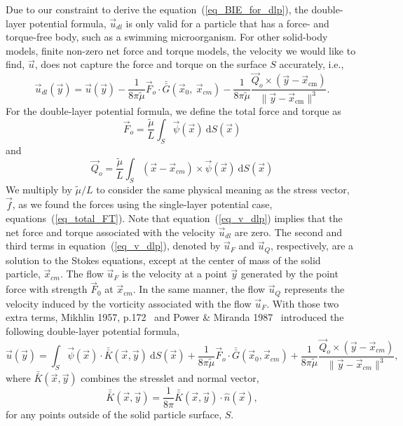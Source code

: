 Due to our constraint to derive the equation~(\ref{eq_BIE_for_dlp}), the double-layer potential formula, $\vec{u}_{dl}$ is only valid for a particle that has a force- and torque-free body, such as a swimming microorganism.
For other solid-body models, finite non-zero net force and torque models, the velocity we would like to find, $\vec{u}$, does not capture the force and torque on the surface $S$ accurately, i.e., 
\begin{equation}
\vec{u}_{dl}(\vec{y}) = \vec{u}(\vec{y}) 
- \frac{1}{8 \pi \tilde{\mu} }\vec{F}_o \cdot \bar{\bar{G}}(\vec{x}_{0}, \ \vec{x}_{cm})
- \frac{1}{8 \pi \tilde{\mu} } \frac{\vec{Q}_o \times  (\vec{y}   - \vec{x}_{\text{cm}} ) }{\| \vec{y}   - \vec{x}_{\text{cm}} \|^3 }.
\label{eq_v_dlp}
\end{equation}
For the double-layer potential formula, we define the total force and torque as
\begin{equation}
 \vec{F}_o
  = \frac{\tilde{\mu}}{L} \int_S \vec{\psi}(\vec{x}) \  \text{d}S(\vec{x})
 \label{alpha_dl}
 \end{equation} 
 and
 \begin{equation}
 \vec{Q}_o 
 = \frac{\tilde{\mu}}{L} \int_S (\vec{x} - \vec{x}_{cm}) \times \vec{\psi}(\vec{x})  \ \text{d}S(\vec{x})
 \label{omega_dl}
 \end{equation}
%
We multiply by $\tilde{\mu} / L$ to consider the same physical meaning as the stress vector, $\vec{f}$, as we found the forces using the single-layer potential case, equations~(\ref{eq_total_FT}).
Note that equation~(\ref{eq_v_dlp}) implies that the net force and torque associated with the velocity $\vec{u}_{dl}$ are zero.
The second and third terms in equation~(\ref{eq_v_dlp}), denoted by $\vec{u}_F$ and $\vec{u}_Q$, respectively, are a solution to the Stokes equations, except at the center of mass of the solid particle, $\vec{x}_{cm}$.
The flow $\vec{u}_F$ is the velocity at a point $\vec{y}$ generated by the point force with strength $\vec{F}_0$ at $\vec{x}_{cm}$. 
In the same manner, the flow $\vec{u}_Q$ represents the velocity induced by the vorticity associated with the flow $\vec{u}_F$.
With those two extra terms, Mikhlin 1957, p.172~\cite{smithies_integral_1959} and Power \& Miranda 1987~\cite{power_second_1987} introduced the following double-layer potential formula,
\begin{equation}
\vec{u}(\vec{y}) = \int_S
\vec{\psi}(\vec{x}) \cdot  \bar{\bar{K}}(\vec{x},\vec{y})  \ \text{d}S(\vec{x}) + 
\frac{1}{8 \pi \tilde{\mu} }\vec{F}_o \cdot \bar{\bar{G}}(\vec{x}_{0},\vec{x}_{cm})
+\frac{1}{8 \pi \tilde{\mu} } \frac{\vec{Q}_o \times  (\vec{y}   - \vec{x}_{cm} ) }{\| \vec{y}   - \vec{x}_{cm} \|^3 },
 \label{eq_BI_DL}
\end{equation}
where $ \bar{\bar{K}}(\vec{x},\vec{y})$ combines the stresslet and normal vector,
\begin{equation*}
	\bar{\bar{K}}(\vec{x},\vec{y})
	= \frac{1}{8 \pi} \bar{\bar{K}}(\vec{x},\vec{y})  \cdot \hat{n}(\vec{x}),
\end{equation*}
for any points outside of the solid particle surface, $S$.


